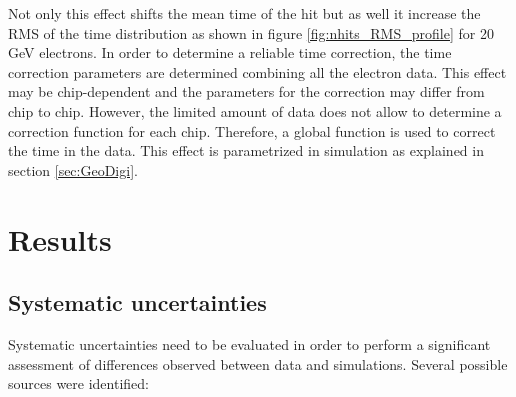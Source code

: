 \documentclass{JINST}
\begin{document}
Not only this effect shifts the mean time of the hit but as well it increase the RMS of the time distribution as shown in figure \ref{fig:nhits_RMS_profile} for 20 GeV electrons. In order to determine a reliable time correction, the time correction parameters are determined combining all the electron data. This effect may be chip-dependent and the parameters for the correction may differ from chip to chip. However, the limited amount of data does not allow to determine a correction function for each chip. Therefore, a global function is used to correct the time in the data. This effect is parametrized in simulation as explained in section \ref{sec:GeoDigi}.

\section{Results}

\subsection{Systematic uncertainties}

Systematic uncertainties need to be evaluated in order to perform a significant assessment of differences observed between data and simulations. Several possible sources were identified:
\end{document}
